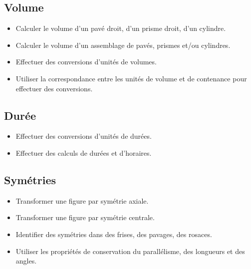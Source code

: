 \documentclass[a4paper,12pt,fleqn]{article}
\begin{document}
\subsection*{Volume}

\begin{itemize}[itemsep=1em]
	\item {}Calculer le volume d’un pavé droit, d’un prisme droit, d’un cylindre.
	\item {}Calculer le volume d’un assemblage de pavés, prismes et/ou cylindres.
	\item {}Effectuer des conversions d’unités de volumes.
	\item {}Utiliser la correspondance entre les unités de volume et de contenance pour effectuer des conversions.
\end{itemize}

\subsection*{Durée}

\begin{itemize}[itemsep=1em]
	\item {}Effectuer des conversions d’unités de durées.
	\item {}Effectuer des calculs de durées et d’horaires.
\end{itemize}

\newpage



\subsection*{Symétries}

\begin{itemize}[itemsep=1em]
	\item {}Transformer une figure par symétrie axiale.
	\item {}Transformer une figure par symétrie centrale.
	\item {}Identifier des symétries dans des frises, des pavages, des rosaces.
	\item {}Utiliser les propriétés de conservation du parallélisme, des longueurs et des angles.
\end{itemize}
\end{document}
